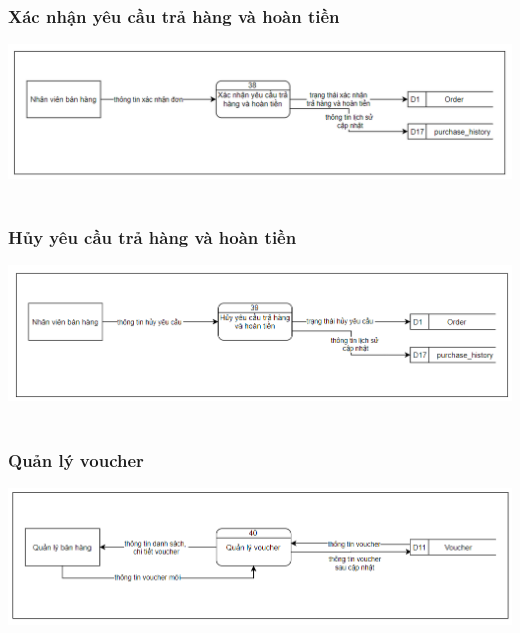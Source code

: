 \documentclass[12pt,a4paper,2sides]{report}
\begin{document}
\subsubsection{Xác nhận yêu cầu trả hàng và hoàn tiền}
    \includegraphics[width=1\linewidth]{lib/DFD/xacnhanyeucautrahg.png}\\\vspace*{1cm} 
    \hspace{4cm}{Hình 29. Xác nhận yêu cầu trả hàng và hoàn tiền}\\
\subsubsection{Hủy yêu cầu trả hàng và hoàn tiền}
    \includegraphics[width=1\linewidth]{lib/DFD/huyyeucauth.png}\\\vspace*{1cm} 
    \hspace{4cm}{Hình 30. Xác nhận yêu cầu trả hàng và hoàn tiền}\\
\subsubsection{Quản lý voucher}
    \includegraphics[width=1\linewidth]{lib/DFD/quanlyvoucher.png}\\\vspace*{1cm} 
    \hspace{5cm}{Hình 31. Quản lý voucher}\\
\end{document}
